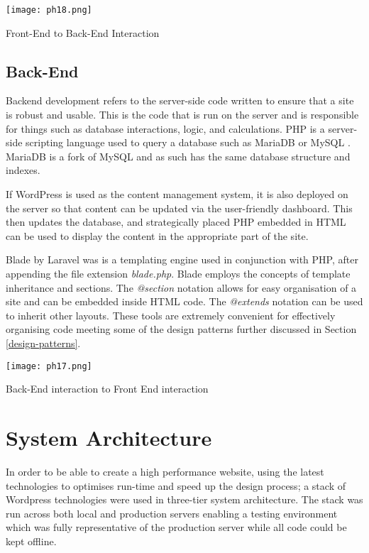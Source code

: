 \documentclass[fontsize=11pt]{extarticle}
\numberwithin{figure}{section} %
\begin{document}
\begin{table}[H]
      \centering
      \texttt{[image: ph18.png]}
      \caption{Front-End to Back-End Interaction}
 \end{table}

\hypertarget{back-end}{%
\subsection{Back-End}\label{back-end}}

Backend development refers to the server-side code written to ensure
that a site is robust and usable. This is the code that is run on the
server and is responsible for things such as database interactions,
logic, and calculations. PHP is a server-side scripting language used to
query a database such as MariaDB or MySQL \cite{p17}. MariaDB is a fork
of MySQL and as such has the same database structure and indexes.
\cite{p24}

If WordPress is used as the content management system, it is also
deployed on the server so that content can be updated via the
user-friendly dashboard. This then updates the database, and
strategically placed PHP embedded in HTML can be used to display the
content in the appropriate part of the site.

Blade by Laravel was is a templating engine used in conjunction with
PHP, after appending the file extension \emph{blade.php}. Blade employs
the concepts of template inheritance and sections. The \emph{@section}
notation allows for easy organisation of a site and can be embedded
inside HTML code. The \emph{@extends} notation can be used to inherit
other layouts. These tools are extremely convenient for effectively
organising code \cite{p18} meeting some of the design patterns further
discussed in Section \ref{design-patterns}.

\begin{table}[H]
      \centering
      \texttt{[image: ph17.png]}
      \caption{Back-End interaction to Front End interaction}
 \end{table}

\newpage

\hypertarget{system-architecture}{%
\section{System Architecture}\label{system-architecture}}

In order to be able to create a high performance website, using the
latest technologies to optimises run-time and speed up the design
process; a stack of Wordpress technologies were used in three-tier
system architecture. The stack was run across both local and production
servers enabling a testing environment which was fully representative of
the production server while all code could be kept offline.
\end{document}
